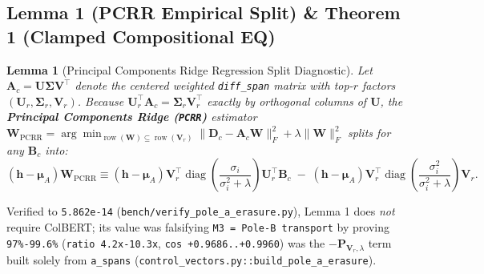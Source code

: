 \documentclass[10pt]{article}
\newtheorem{lemma}{Lemma}
\begin{document}
\subsection{Lemma 1 (PCRR Empirical Split) \& Theorem 1 (Clamped Compositional EQ)}

\begin{lemma}[Principal Components Ridge Regression Split Diagnostic]
Let $\mathbf{A}_c = \mathbf{U}\boldsymbol{\Sigma}\mathbf{V}^\top$ denote the centered weighted \texttt{diff\_span} matrix with top-$r$ factors $(\mathbf{U}_r, \boldsymbol{\Sigma}_r, \mathbf{V}_r)$. Because $\mathbf{U}_r^\top \mathbf{A}_c = \boldsymbol{\Sigma}_r \mathbf{V}_r^\top$ exactly by orthogonal columns of $\mathbf{U}$, the \textbf{Principal Components Ridge (\texttt{PCRR})} estimator $\mathbf{W}_{\text{PCRR}} = \arg\min_{\operatorname{row}(\mathbf{W}) \subseteq \operatorname{row}(\mathbf{V}_r)} \|\mathbf{D}_c - \mathbf{A}_c \mathbf{W}\|_F^2 + \lambda\|\mathbf{W}\|_F^2$ splits for any $\mathbf{B}_c$ into:
\[
(\mathbf{h} - \boldsymbol{\mu}_A)\mathbf{W}_{\text{PCRR}} \equiv (\mathbf{h} - \boldsymbol{\mu}_A)\mathbf{V}_r^\top \operatorname{diag}\!\left(\frac{\sigma_i}{\sigma_i^2 + \lambda}\right)\mathbf{U}_r^\top \mathbf{B}_c \;-\; (\mathbf{h} - \boldsymbol{\mu}_A)\mathbf{V}_r^\top \operatorname{diag}\!\left(\frac{\sigma_i^2}{\sigma_i^2 + \lambda}\right)\mathbf{V}_r.
\]
\end{lemma}

Verified to \texttt{5.862e-14} (\texttt{bench/verify\_pole\_a\_erasure.py}), Lemma 1 does \emph{not} require ColBERT; its value was falsifying \texttt{M3 = Pole-B transport} by proving \texttt{97\%-99.6\%} (\texttt{ratio 4.2x-10.3x}, \texttt{cos +0.9686..+0.9960}) was the $-\mathbf{P}_{\mathbf{V}_r,\lambda}$ term built solely from \texttt{a\_spans} (\texttt{control\_vectors.py::build\_pole\_a\_erasure}).
\end{document}
